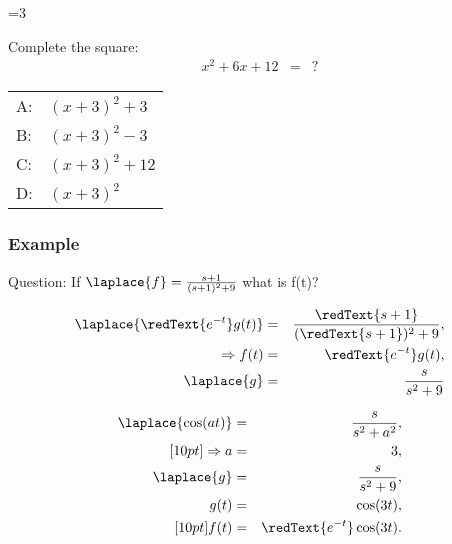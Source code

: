 {\begin{frame}
{   \vfill
   }\fi

  \ifnum\value{clickerQuiz}=3{%
    Complete the square:
     \begin{eqnarray*}
       x^2+6x+12 & = & ?
     \end{eqnarray*}

     \vspace{2em}
     \begin{tabular}{ll}
       A: &  $(x+3)^2+3$ \\ [12pt]
       B: &  $(x+3)^2-3$ \\ [12pt]
       C: &  $(x+3)^2+12$ \\ [12pt]
       D: &  $(x+3)^2$ \\ [12pt]
     \end{tabular}


  \vfill
 }\fi
\end{frame}
}


\begin{frame}
  \frametitle{Example}

  \begin{block}{Question:}
    If $\laplace{f} = \frac{s+1}{(s+1)^2+9}$ what is f(t)?
  \end{block}

  {
    \begin{eqnarray*}
      \laplace{\redText{e^{-t}}g(t)} & = & \frac{\redText{s+1}}{(\redText{s+1})^2+9}, \\
      \Rightarrow f(t) & = & \redText{e^{-t}} g(t), \\
      \laplace{g} & = & \frac{s}{s^2+9}
    \end{eqnarray*}
  }



\end{frame}


\begin{frame}

    \begin{eqnarray*}
      \laplace{\cos(at)} & = & \frac{s}{s^2+a^2}, \\ [10pt]
      \Rightarrow a & = & 3, \\
      \laplace{g} & = & \frac{s}{s^2+9}, \\
      g(t) & = & \cos(3t), \\ [10pt]
      f(t) & = & \redText{e^{-t}}\cos(3t).
    \end{eqnarray*}

\end{frame}


